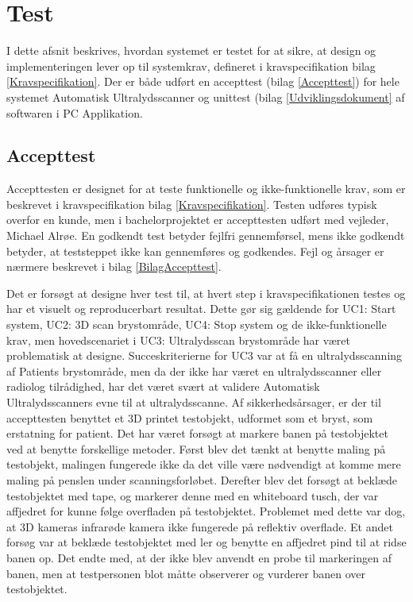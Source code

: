 \chapter{Test}\label{Test}
I dette afsnit beskrives, hvordan systemet er testet for at sikre, at design og implementeringen lever op til systemkrav, defineret i kravspecifikation bilag \ref{Kravspecifikation}. Der er både udført en accepttest (bilag \ref{Accepttest})  for hele systemet Automatisk Ultralydsscanner og unittest (bilag \ref{Udviklingsdokument} af softwaren i PC Applikation. 

\section{Accepttest}

Accepttesten er designet for at teste funktionelle og ikke-funktionelle krav, som er beskrevet i kravspecifikation bilag \ref{Kravspecifikation}. Testen udføres typisk overfor en kunde, men i bachelorprojektet er accepttesten udført med vejleder, Michael Alrøe. En godkendt test betyder fejlfri gennemførsel, mens ikke godkendt betyder, at teststeppet ikke kan gennemføres og godkendes. Fejl og årsager er nærmere beskrevet i bilag \ref{BilagAccepttest}.  

Det er forsøgt at designe hver test til, at hvert step i kravspecifikationen testes og har et visuelt og reproducerbart resultat. Dette gør sig gældende for UC1: Start system, UC2: 3D scan brystområde, UC4: Stop system og de ikke-funktionelle krav, men hovedscenariet i UC3: Ultralydsscan brystområde har været problematisk at designe. Succeskriterierne for UC3 var at få en ultralydsscanning af Patients brystområde, men da der ikke har været en ultralydsscanner eller radiolog tilrådighed, har det været svært at validere Automatisk Ultralydsscanners evne til at ultralydsscanne. Af sikkerhedsårsager, er der til accepttesten benyttet et 3D printet testobjekt, udformet som et bryst, som erstatning for patient. Det har været forsøgt at markere banen på testobjektet ved at benytte forskellige metoder. Først blev det tænkt at benytte maling på testobjekt, malingen fungerede ikke da det ville være nødvendigt at komme mere maling på penslen under scanningsforløbet. Derefter blev det forsøgt at beklæde testobjektet med tape, og markerer denne med en whiteboard tusch, der var affjedret for kunne følge overfladen på testobjektet. Problemet med dette var dog, at 3D kameras infrarøde kamera ikke fungerede på reflektiv overflade. Et andet forsøg var at beklæde testobjektet med ler og benytte en affjedret pind til at ridse banen op. Det endte med, at der ikke blev anvendt en probe til markeringen af banen, men at testpersonen blot måtte observerer og vurderer banen over testobjektet. 

